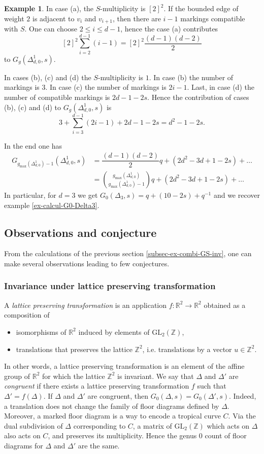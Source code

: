 \documentclass[11pt]{article}
\theoremstyle{definition}
\newtheorem{exam}[theo]{Example}
\numberwithin{equation}{section}
\newcommand{\R}{\mathbb{R}}
\newcommand{\Z}{\mathbb{Z}}
\newcommand{\GL}{\mathrm{GL}}
\newcommand{\dsum}{\displaystyle\sum}
\newcommand{\gmax}{g_{\max}}
\theoremstyle{plain}
\begin{document}
\begin{exam}
	In case (a), the $S$-multiplicity is $[2]^2$. If the bounded edge of weight $2$ is adjacent to $v_i$ and $v_{i+1}$, then there are $i-1$ markings compatible with $S$. One can choose $2\leqslant i \leqslant d-1$, hence the case (a) contributes
	\[ [2]^2 \dsum_{i=2}^{d-1} (i-1) = [2]^2 \dfrac{(d-1)(d-2)}{2} \]
	to $G_g(\Delta^1_{d,0},s)$.
	
	In cases (b), (c) and (d) the $S$-multiplicity is $1$. In case (b) the number of markings is $3$. In case (c) the number of markings is $2i-1$. Last, in case (d) the number of compatible markings is $2d-1-2s$. Hence the contribution of cases (b), (c) and (d) to $G_g(\Delta^1_{d,0},s)$ is
	\[ 3 + \dsum_{i=3}^{d-1}(2i-1) + 2d-1-2s = d^2-1-2s .\]
	
	In the end one has
	\begin{align*}
	G_{\gmax(\Delta^1_{d,0})-1}(\Delta^1_{d,0},s)
	  &= \dfrac{(d-1)(d-2)}{2} q + (2d^2-3d+1-2s) + \dots \\
	  &= \binom{\gmax(\Delta^1_{d,0})}{\gmax(\Delta^1_{d,0})-1} q + (2d^2-3d+1-2s) + \dots
	\end{align*}	
In particular, for $d=3$ we get $G_0(\Delta_3,s) = q + (10-2s) + q^{-1}$ and we recover example \ref{ex-calcul-G0-Delta3}.	
\end{exam}

\subsection{Observations and conjecture}

From the calculations of the previous section \ref{subsec-ex-combi-GS-inv}, one can make several observations leading to few conjectures.

\subsubsection{Invariance under lattice preserving transformation}



A \emph{lattice preserving transformation} is an application $f : \R^2 \to \R^2$ obtained as a composition of
\begin{itemize}
    \item isomorphisms of $\R^2$ induced by elements of $\GL_2(\Z)$,
    \item translations that preserves the lattice $\Z^2$, i.e.  translations by a vector $u\in\Z^2$.
\end{itemize} 
In other words, a lattice preserving transformation is an element of the affine group of $\R^2$ for which the lattice $\Z^2$ is invariant.  
We say that  $\Delta$ and $\Delta'$ are \emph{congruent} if there exists a lattice preserving transformation $f$ such that $\Delta' = f(\Delta)$. If $\Delta$ and $\Delta'$ are congruent, then $G_0(\Delta,s) = G_0(\Delta',s)$.
Indeed, a translation does not change the family of floor diagrams defined by $\Delta$. Moreover, a marked floor diagram is a way to encode a tropical curve $C$. Via the dual subdivision of $\Delta$ corresponding to $C$, a matrix of $\GL_2(\Z)$ which acts on $\Delta$ also acts on $C$, and preserves its multiplicity. Hence the genus $0$ count of floor diagrams for $\Delta$ and $\Delta'$ are the same.
\end{document}
